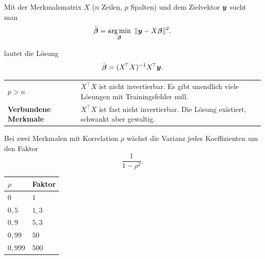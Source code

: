 \begin{merksatz}
Mit der Merkmalsmatrix $X$ ($n$ Zeilen, $p$ Spalten) und dem Zielvektor $\boldsymbol{y}$ sucht man
\[ \hat{\boldsymbol{\beta}} = \operatorname*{arg\,min}_{\boldsymbol{\beta}}\ \|\boldsymbol{y} - X\boldsymbol{\beta}\|^{2} . \]

 lautet die Lösung
\[ \hat{\boldsymbol{\beta}} = (X^{\!\top}X)^{-1}X^{\!\top}\boldsymbol{y} . \]

\begin{center}
{\small
\renewcommand{\arraystretch}{1.5}
\begin{tabular}{@{}P{2.6cm}P{6.0cm}@{}}
\toprule
\textbf{$p > n$} & $X^{\!\top}X$ ist nicht invertierbar. Es gibt unendlich viele Lösungen mit Trainingsfehler null.\\
\textbf{Verbundene Merkmale} & $X^{\!\top}X$ ist fast nicht invertierbar. Die Lösung existiert, schwankt aber gewaltig.\\
\bottomrule
\end{tabular}}
\end{center}

Bei zwei Merkmalen mit Korrelation $\rho$ wächst die Varianz jedes Koeffizienten um den Faktor
\[ \frac{1}{1-\rho^{2}} . \]

\begin{center}
{\small
\renewcommand{\arraystretch}{1.46}
\begin{tabular}{@{}P{2.0cm}P{2.6cm}@{}}
\toprule
$\rho$ & \textbf{Faktor}\\
\midrule
$0$ & $1$\\
$0{,}5$ & $1{,}3$\\
$0{,}9$ & $5{,}3$\\
$0{,}99$ & $50$\\
$0{,}999$ & $500$\\
\bottomrule
\end{tabular}}
\end{center}

\begin{center}
\begin{minipage}{0.88\textwidth}
\end{minipage}
\end{center}
\end{merksatz}

